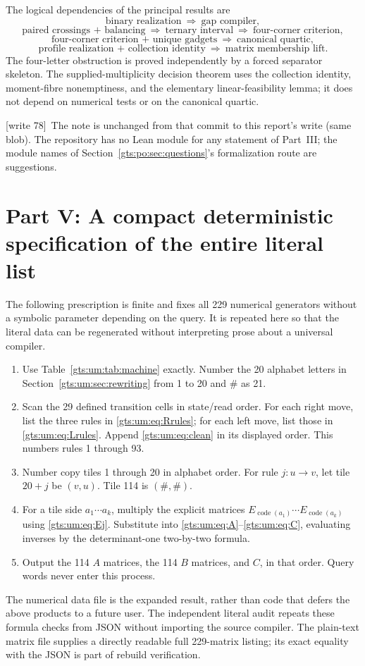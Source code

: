 \documentclass[11pt,letterpaper]{article}
\theoremstyle{definition}
\theoremstyle{remark}
\newcommand{\hto}{\mathrel{\longrightarrow}}
\newcommand{\wtagb}{\textup{[write 78]}}
\begin{document}
The logical dependencies of the principal results are
\[
 \text{binary realization}\ \Longrightarrow\ \text{gap compiler},
\]
\[
 \text{paired crossings + balancing}\ \Longrightarrow\
 \text{ternary interval}\ \Longrightarrow\ \text{four-corner criterion},
\]
\[
 \text{four-corner criterion + unique gadgets}\ \Longrightarrow\
 \text{canonical quartic},
\]
\[
 \text{profile realization + collection identity}\ \Longrightarrow\
 \text{matrix membership lift}.
\]
The four-letter obstruction is proved independently by a forced separator skeleton. The supplied-multiplicity decision theorem uses the collection identity, moment-fibre nonemptiness, and the elementary linear-feasibility lemma; it does not depend on numerical tests or on the canonical quartic.

\wtagb\ The note is unchanged from that commit to this report's write (same blob). The repository has no Lean module for any statement of Part~III; the module names of Section~\ref{gts:po:sec:questions}'s formalization route are suggestions.

\section[Part V: Deterministic specification of the literal matrix list]{Part V: A compact deterministic specification of the entire literal list}
\label{gts:um:app:literal}
The following prescription is finite and fixes all 229 numerical generators without a symbolic parameter depending on the query. It is repeated here so that the literal data can be regenerated without interpreting prose about a universal compiler.
\begin{enumerate}
\item Use Table~\ref{gts:um:tab:machine} exactly. Number the 20 alphabet letters in Section~\ref{gts:um:sec:rewriting} from 1 to 20 and $\#$ as 21.
\item Scan the 29 defined transition cells in state/read order. For each right move, list the three rules in \eqref{gts:um:eq:Rrules}; for each left move, list those in \eqref{gts:um:eq:Lrules}. Append \eqref{gts:um:eq:clean} in its displayed order. This numbers rules 1 through 93.
\item Number copy tiles 1 through 20 in alphabet order. For rule $j:u\hto v$, let tile $20+j$ be $(v,u)$. Tile 114 is $(\#,\#)$.
\item For a tile side $a_1\cdots a_k$, multiply the explicit matrices $E_{\operatorname{code}(a_1)}\cdots E_{\operatorname{code}(a_k)}$ using \eqref{gts:um:eq:Ej}. Substitute into \eqref{gts:um:eq:A}--\eqref{gts:um:eq:C}, evaluating inverses by the determinant-one two-by-two formula.
\item Output the 114 $A$ matrices, the 114 $B$ matrices, and $C$, in that order. Query words never enter this process.
\end{enumerate}
The numerical data file is the expanded result, rather than code that defers the above products to a future user. The independent literal audit repeats these formula checks from JSON without importing the source compiler. The plain-text matrix file supplies a directly readable full 229-matrix listing; its exact equality with the JSON is part of rebuild verification.
\end{document}
